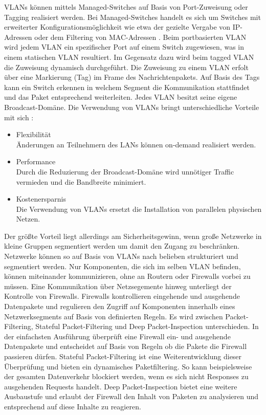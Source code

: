 VLANs können mittels \glqq{}Managed-Switches\grqq{} auf Basis von Port-Zuweisung oder \glqq{}Tagging\grqq{} realisiert werden. Bei Managed-Switches handelt es sich um Switches mit erweiterter Konfigurationsmöglichkeit wie etwa der gezielte Vergabe von IP-Adressen oder dem Filtering von MAC-Adressen \autocite{netgear}.
Beim portbasierten VLAN wird jedem VLAN ein spezifischer Port auf einem Switch zugewiesen, was in einem statischen VLAN resultiert. Im Gegensatz dazu wird beim tagged VLAN die Zuweisung dynamisch durchgeführt. Die Zuweisung zu einem VLAN erfolt über eine Markierung (Tag) im Frame des Nachrichtenpakets. Auf Basis des Tags kann ein Switch erkennen in welchem Segment die Kommunikation stattfindet und das Paket entsprechend weiterleiten. Jedes VLAN besitzt seine eigene Broadcast-Domäne. \autocite{ionos_digitalguide}
\bigbreak
Die Verwendung von VLANs bringt unterschiedliche Vorteile mit sich \autocite{ionos_digitalguide}:
\begin{itemize}
    \item Flexibilität\\
    Änderungen an Teilnehmern des LANs können on-demand realisiert werden.
    \item Performance\\
    Durch die Reduzierung der Broadcast-Domäne wird unnötiger Traffic vermieden und die Bandbreite minimiert.
    \item Kostenersparnis\\
    Die Verwendung von VLANs ersetzt die Installation von parallelen physischen Netzen.
\end{itemize}
\bigbreak
Der größte Vorteil liegt allerdings am Sicherheitsgewinn, wenn große Netzwerke in kleine Gruppen segmentiert werden um damit den Zugang zu beschränken. Netzwerke können so auf Basis von VLANs nach belieben strukturiert und segmentiert werden. Nur Komponenten, die sich im selben VLAN befinden, können miteinander kommunizieren, ohne an Routern oder Firewalls vorbei zu müssen. Eine Kommunikation über Netzsegemente hinweg unterliegt der Kontrolle von Firewalls. \autocite{ionos_digitalguide}
\bigbreak
Firewalls kontrollieren eingehende und ausgehende Datenpakete und regulieren den Zugriff auf Komponenten innerhalb eines Netzwerksegments auf Basis von definierten Regeln. Es wird zwischen \glqq{}Packet-Filtering\grqq{}, \glqq{}Stateful Packet-Filtering\grqq{} und \glqq{}Deep Packet-Inspection\grqq{} unterschieden. In der einfachsten Ausführung überprüft eine Firewall ein- und ausgehende Datenpakete und entscheidet auf Basis von Regeln ob die Pakete die Firewall passieren dürfen. Stateful Packet-Filtering ist eine Weiterentwicklung dieser Überprüfung und bieten ein dynamisches Paketfiltering. So kann beispielsweise der gesamten Datenverkehr blockiert werden, wenn es sich nicht Responses zu ausgehenden Requests handelt. Deep Packet-Inspection bietet eine weitere Ausbaustufe und erlaubt der Firewall den Inhalt von Paketen zu analysieren und entsprechend auf diese Inhalte zu reagieren. \autocite{SheikhAhmedF2020CSCS}
